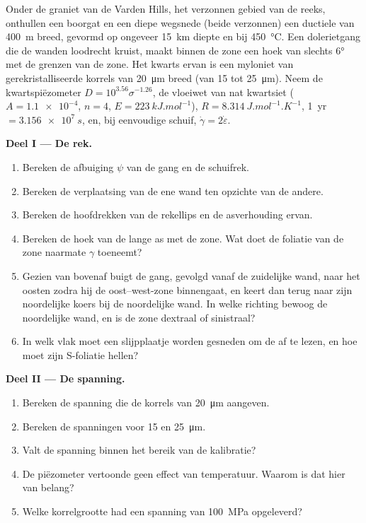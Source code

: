 \begin{problem}
\label{pb:b3:deformation-mechanisms:1}
Onder de graniet van de Varden Hills, het verzonnen gebied van de reeks, onthullen een
boorgat en een diepe wegsnede (beide verzonnen) een ductiele 
van \qty{400}{m} breed, gevormd op ongeveer \qty{15}{km} diepte en bij \qty{450}{\celsius}.
Een dolerietgang die de wanden loodrecht kruist, maakt binnen de zone
een hoek van slechts \ang{6} met de grenzen van de zone. Het kwarts ervan is een myloniet
van gerekristalliseerde korrels van \qty{20}{\micro m} breed (van 15 tot
\qty{25}{\micro m}). Neem de kwartspiëzometer $D = 10^{3.56}\sigma^{-1.26}$,
de vloeiwet van nat kwartsiet ($A = \num{1.1e-4}$, $n = 4$, $E =
\qty{223}{kJ.mol^{-1}}$), $R = \qty{8.314}{J.mol^{-1}.K^{-1}}$, \qty{1}{yr} $=
\qty{3.156e7}{s}$, en, bij eenvoudige schuif, $\dot\gamma = 2\dot\varepsilon$.

\medskip\noindent\textbf{Deel I --- De rek.}
\begin{enumerate}
  \item Bereken de afbuiging $\psi$ van de gang en de schuifrek.
  \item Bereken de verplaatsing van de ene wand ten opzichte van de andere.
  \item Bereken de hoofdrekken van de rekellips en
        de asverhouding ervan.
  \item Bereken de hoek van de lange as met de zone. Wat doet de
        foliatie van de zone naarmate $\gamma$ toeneemt?
  \item Gezien van bovenaf buigt de gang, gevolgd vanaf de zuidelijke wand, naar het
        oosten zodra hij de oost--west-zone binnengaat, en keert dan
        terug naar zijn noordelijke koers bij de noordelijke wand. In welke
        richting bewoog de noordelijke wand, en is de zone dextraal of sinistraal?
  \item In welk vlak moet een slijpplaatje worden gesneden om de  af te lezen, en hoe moet zijn S-foliatie hellen?
\end{enumerate}

\medskip\noindent\textbf{Deel II --- De spanning.}
\begin{enumerate}[resume]
  \item Bereken de spanning die de korrels van \qty{20}{\micro m} aangeven.
  \item Bereken de spanningen voor 15 en \qty{25}{\micro m}.
  \item Valt de spanning binnen het bereik van de kalibratie?
  \item De piëzometer vertoonde geen effect van temperatuur. Waarom is dat hier
        van belang?
  \item Welke korrelgrootte had een spanning van \qty{100}{MPa} opgeleverd?
\end{enumerate}


\end{problem}
